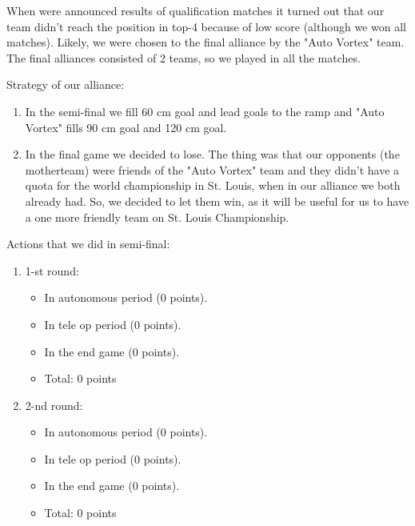 When were announced results of qualification matches it turned out that our team didn't reach the position in top-4 because of low score (although we won all matches). Likely, we were chosen to the final alliance by the "Auto Vortex" team. The final alliances consisted of 2 teams, so we played in all the matches.\newline

Strategy of our alliance:
\begin{enumerate}
	\item In the semi-final we fill 60 cm goal and lead goals to the ramp and "Auto Vortex" fills 90 cm goal and 120 cm goal.
	
	\item In the final game we decided to lose. The thing was that our opponents (the motherteam) were friends of the "Auto Vortex" team and they didn't have a quota for the world championship in St. Louis, when in our alliance we both already had. So, we decided to let them win, as it will be useful for us to have a one more friendly team on St. Louis Championship.
\end{enumerate}


Actions that we did in semi-final:
\begin{enumerate}
	\item 1-st round:
	\begin{itemize}
		\item In autonomous period (0 points).
		
		\item In tele op period (0 points).
		
		\item In the end game  (0 points).
		
		\item Total: 0 points
	\end{itemize}
	\item 2-nd round:
	\begin{itemize}
		\item In autonomous period (0 points).
		
		\item In tele op period (0 points).
		
		\item In the end game  (0 points).
		
		\item Total: 0 points
	\end{itemize}
\end{enumerate}


